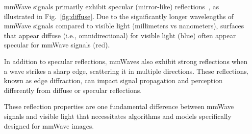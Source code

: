 mmWave signals primarily exhibit specular (mirror-like) reflections~\cite{mmwave_specular}, as illustrated in Fig.~\ref{fig:diffuse}. Due to the significantly longer wavelengths of mmWave signals compared to visible light (millimeters vs nanometers), surfaces that appear diffuse (i.e., omnidirectional) for visible light (blue) often appear specular for mmWave signals (red).

In addition to specular reflections, mmWaves also exhibit strong reflections when a wave strikes a sharp edge, scattering it in multiple directions.
These reflections, known as edge diffraction, can impact signal propagation and perception differently from diffuse or specular reflections.

These reflection properties are one fundamental difference between mmWave signals and visible light that necessitates algorithms and models specifically designed for mmWave images.
